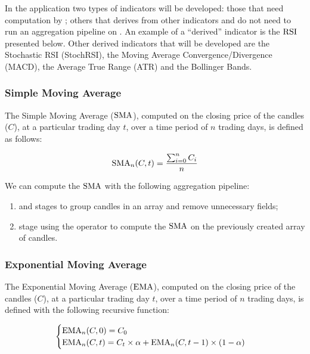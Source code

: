 In the application two types of indicators will be developed: those that need
computation by \mongodb{}; others that derives from other indicators and do not
need to run an aggregation pipeline on \mongodb{}. An example of a ``derived''
indicator is the \(\operatorname{RSI}\) presented below. Other derived indicators that will be
developed are the Stochastic RSI (StochRSI), the Moving Average
Convergence/Divergence (MACD), the Average True Range (ATR) and the Bollinger
Bands.

\subsubsection{Simple Moving Average}

The Simple Moving Average (\(\operatorname{SMA}\)), computed on the closing price of the
candles (\(C\)), at a particular trading day \(t\), over a time period of \(n\)
trading days, is defined as follows:

\begin{equation}\label{eq:sma}
	\operatorname{SMA}_n(C,t) = \frac{\sum_{i = 0}^n C_i}{n}
\end{equation}

We can compute the \(\operatorname{SMA}\) with the following aggregation pipeline:

\begin{enumerate}
	\item {} and  stages to group candles in an
		array and remove unnecessary fields;
	\item {} stage using the  operator to
		compute the \(\operatorname{SMA}\) on the previously created array of candles.
\end{enumerate}

\subsubsection{Exponential Moving Average}

The Exponential Moving Average (\(\operatorname{EMA}\)), computed on the closing price of the
candles (\(C\)), at a particular trading day \(t\), over a time period of \(n\)
trading days, is defined with the following recursive function:

\begin{equation}\label{eq:ema}
	\begin{cases}
		\operatorname{EMA}_n(C,0) = C_0\\
		\operatorname{EMA}_n(C,t) = C_t\times\alpha +
		\operatorname{EMA}_n(C,t-1)\times(1-\alpha)
	\end{cases}
\end{equation}

